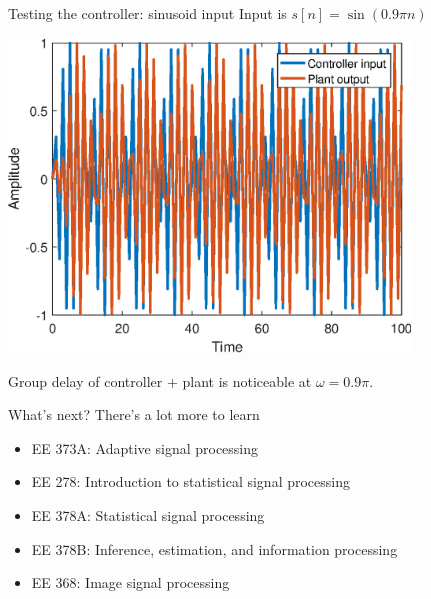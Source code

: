 \documentclass[10pt]{beamer}
\begin{document}
%
\begin{frame}{Testing the controller: sinusoid input}
Input is $s[n] = \sin(0.9\pi n)$
\begin{center}
\includegraphics[width=0.8\textwidth]{../homework/figs/inverse_control_sin2.eps}
\end{center}

Group delay of controller + plant is noticeable at $\omega = 0.9\pi$.
\end{frame}

%
\begin{frame}{What's next?}
There's a lot more to learn
\begin{itemize}
\item EE 373A: Adaptive signal processing
\item EE 278: Introduction to statistical signal processing
\item EE 378A: Statistical signal processing
\item EE 378B: Inference, estimation, and information processing
\item EE 368: Image signal processing	
\end{itemize}
\end{frame}
\end{document}
